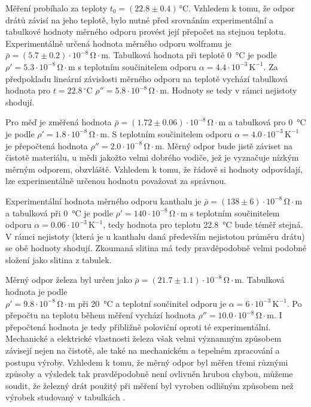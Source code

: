 \documentclass{../concepts/prepareprotokol} %
\begin{document}
Měření probíhalo za teploty $t_0 = (22.8 \pm 0.4) \, \si{\celsius}$. Vzhledem k tomu, že odpor drátů závisí na jeho teplotě, bylo nutné před srovnáním experimentální a tabulkové hodnoty měrného odporu provést její přepočet na stejnou teplotu. Experimentálně určená hodnota měrného odporu wolframu je $\bar{\rho} = (5.7 \pm 0.2) \cdot 10^{-8} \, \mathrm{\Omega \cdot m}$. Tabulková hodnota při teplotě \SI{0}{\celsius} je podle \cite{mikulcak} $\rho' = 5.3 \cdot 10^{-8} \, \mathrm{\Omega \cdot m}$ s teplotním součinitelem odporu $\alpha = 4.4 \cdot 10^{-3} \, \mathrm{K^{-1}}$. Za předpokladu lineární závislosti měrného odporu na teplotě vychází tabulková hodnota pro $t = 22.8 \,^\circ \mathrm{C}$ $\rho'' = 5.8 \cdot 10^{-8} \, \mathrm{\Omega \cdot m}$. Hodnoty se tedy v rámci nejistoty shodují. 

Pro měď je změřená hodnota $\bar{\rho} = (1.72 \pm 0.06) \cdot 10^{-8} \, \mathrm{\Omega \cdot m}$ a tabulková pro \SI{0}{\celsius} je podle \cite{mikulcak} $\rho' = 1.8 \cdot 10^{-8} \, \mathrm{\Omega \cdot m}$. S teplotním součinitelem odporu $\alpha = 4.0 \cdot 10^{-3} \, \mathrm{K^{-1}}$ je přepočtená hodnota $\rho'' = 2.0 \cdot 10^{-8} \, \mathrm{\Omega \cdot m}$. Měrný odpor bude jistě záviset na čistotě materiálu, u mědi jakožto velmi dobrého vodiče, jež je vyznačuje nízkým měrným odporem, obzvláště. Vzhledem k tomu, že řádově si hodnoty odpovídají, lze experimentálně určenou hodnotu považovat za správnou.

Experimentální hodnota měrného odporu kanthalu je $\bar{\rho} = (138 \pm 6) \cdot 10^{-8} \, \mathrm{\Omega \cdot m}$ a tabulková při \SI{0}{\celsius} je podle \cite{mikulcak} $\rho' = 140 \cdot 10^{-8} \, \mathrm{\Omega \cdot m}$ s teplotním součinitelem odporu $\alpha = 0.06 \cdot 10^{-3} \, \mathrm{K^{-1}}$, tedy hodnota pro teplotu \SI{22.8}{\celsius} bude téměř stejná. V rámci nejistoty (která je u kanthalu daná především nejistotou průměru drátu) se obě hodnoty shodují. Zkoumaná slitina má tedy pravděpodobně velmi podobné složení jako slitina z tabulek.

Měrný odpor železa byl určen jako $\bar{\rho} = (21.7 \pm 1.1) \cdot 10^{-8} \, \mathrm{\Omega \cdot m}$. Tabulková hodnota je podle \cite{zelezo} \\ $\rho' = 9.8 \cdot 10^{-8} \, \mathrm{\Omega \cdot m}$ při \SI{20}{\celsius} a teplotní součinitel odporu je $\alpha = 6 \cdot 10^{-3} \, \mathrm{K^{-1}}$. Po přepočtu na teplotu během měření vychází hodnota $\rho'' = 10.0 \cdot 10^{-8} \, \mathrm{\Omega \cdot m}$. I přepočtená hodnota je tedy přibližně poloviční oproti té experimentální. Mechanické a elektrické vlastnosti železa však velmi významným způsobem závisejí nejen na čistotě, ale také na mechanickém a tepelném zpracování a postupu výroby. Vzhledem k tomu, že měrný odpor byl měřen třemi různými způsoby a výsledek tak pravděpodobně není ovlivněn hrubou chybou, můžeme soudit, že železný drát použitý při měření byl vyroben odlišným způsobem než výrobek studovaný v tabulkách \cite{zelezo}.
\end{document}
